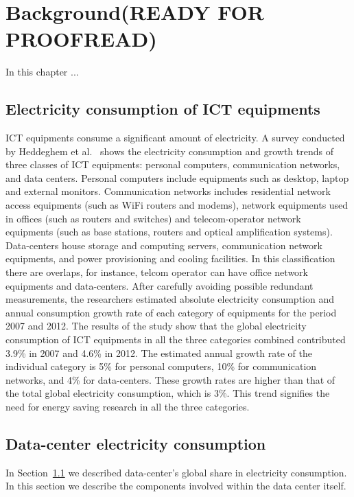 \chapter{Background(READY FOR PROOFREAD)}
\label{chapter:background} 
In this chapter ...
\section{Electricity consumption of ICT equipments}
\label{section:ictequipment} 
ICT equipments consume a significant amount of electricity. A survey conducted by Heddeghem et al.{\ }\cite{DBLP:journals/comcom/HeddeghemLLCPD14} shows the electricity consumption and growth trends of three classes of ICT equipments: personal computers, communication networks, and data centers. Personal computers include equipments such as desktop, laptop and external monitors. Communication networks includes residential network access equipments (such as WiFi routers and modems), network equipments used in offices (such as routers and switches) and telecom-operator network equipments (such as base stations, routers and optical amplification systems). Data-centers house storage and computing servers, communication network equipments, and power provisioning and cooling facilities.  In this classification there are overlaps, for instance, telcom operator can have office network equipments and data-centers. After carefully avoiding possible redundant measurements, the researchers estimated absolute electricity consumption and annual consumption growth rate of each category of equipments for the period 2007 and 2012. The results of the study show that the global electricity consumption of ICT equipments in all the three categories combined contributed 3.9\% in 2007 and 4.6\% in 2012. The estimated annual growth rate of the individual category is 5\% for personal computers, 10\% for communication networks, and 4\% for data-centers. These growth rates are higher than that of the total global electricity consumption, which is 3\%. This trend signifies the need for energy saving research in all the three categories.

\section {Data-center electricity consumption}
\label{section:datacenter} 
In Section~\ref{section:ictequipment} we described data-center's global share in electricity consumption. In this section we describe the components involved within the data center itself.

